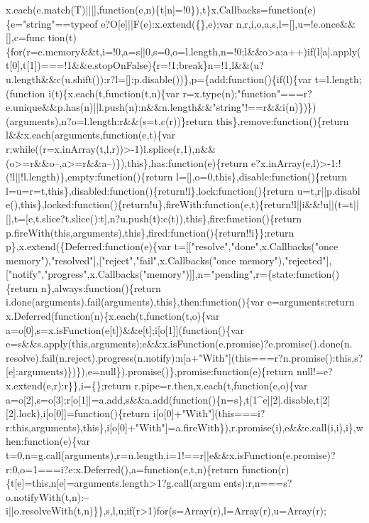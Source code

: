 \begin{DoxyCode}
{       x.each(e.match(T)||[],function(e,n)\{t[n]=!0\}),t\}x.Callbacks=function(e)\{e="string"==typeof e?O[e]||F(e):x.extend(\{\},e);var
       n,r,i,o,a,s,l=[],u=!e.once&&[],c=func
      tion(t)\{for(r=e.memory&&t,i=!0,a=s||0,s=0,o=l.length,n=!0;l&&o>a;a++)if(l[a].apply(t[0],t[1])===!1&&e.stopOnFalse)\{r=!1;break\}n=!1,l&&(u?u.length&&c(u.shift()):r?l=[]:p.disable())\},p=\{add:function()\{if(l)\{var
       t=l.length;(function i(t)\{x.each(t,function(t,n)\{var
       r=x.type(n);"function"===r?e.unique&&p.has(n)||l.push(n):n&&n.length&&"string"!==r&&i(n)\})\})(arguments),n?o=l.length:r&&(s=t,c(r))\}return this\},remove:function()\{return
       l&&x.each(arguments,function(e,t)\{var
       r;while((r=x.inArray(t,l,r))>-1)l.splice(r,1),n&&(o>=r&&o--,a>=r&&a--)\}),this\},has:function(e)\{return e?x.inArray(e,l)>-1:!(!l||!l.length)\},empty:function()\{return
       l=[],o=0,this\},disable:function()\{return l=u=r=t,this\},disabled:function()\{return!l\},lock:function()\{return
       u=t,r||p.disabl
      e(),this\},locked:function()\{return!u\},fireWith:function(e,t)\{return!l||i&&!u||(t=t||[],t=[e,t.slice?t.slice():t],n?u.push(t):c(t)),this\},fire:function()\{return
       p.fireWith(this,arguments),this\},fired:function()\{return!!i\}\};return p\},x.extend(\{Deferred:function(e)\{var t=[["resolve","done",x.Callbacks("once
       memory"),"resolved"],["reject","fail",x.Callbacks("once
       memory"),"rejected"],["notify","progress",x.Callbacks("memory")]],n="pending",r=\{state:function()\{return n\},always:function()\{return
       i.done(arguments).fail(arguments),this\},then:function()\{var e=arguments;return x.Deferred(function(n)\{x.each(t,function(t,o)\{var
       a=o[0],s=x.isFunction(e[t])&&e[t];i[o[1]](function()\{var
       e=s&&s.apply(this,arguments);e&&x.isFunction(e.promise)?e.promise().done(n.
      resolve).fail(n.reject).progress(n.notify):n[a+"With"](this===r?n.promise():this,s?[e]:arguments)\})\}),e=null\}).promise()\},promise:function(e)\{return null!=e?x.extend(e,r):r\}\},i=\{\};return
       r.pipe=r.then,x.each(t,function(e,o)\{var
       a=o[2],s=o[3];r[o[1]]=a.add,s&&a.add(function()\{n=s\},t[1^e][2].disable,t[2][2].lock),i[o[0]]=function()\{return
       i[o[0]+"With"](this===i?r:this,arguments),this\},i[o[0]+"With"]=a.fireWith\}),r.promise(i),e&&e.call(i,i),i\},when:function(e)\{var
       t=0,n=g.call(arguments),r=n.length,i=1!==r||e&&x.isFunction(e.promise)?r:0,o=1===i?e:x.Deferred(),a=function(e,t,n)\{return
       function(r)\{t[e]=this,n[e]=arguments.length>1?g.call(argum
      ents):r,n===s?o.notifyWith(t,n):--i||o.resolveWith(t,n)\}\},s,l,u;if(r>1)for(s=Array(r),l=Array(r),u=Array(r);
}
\end{DoxyCode}
